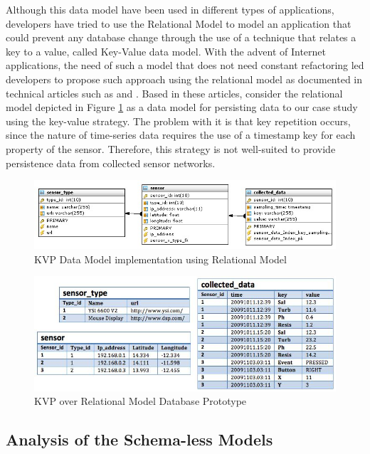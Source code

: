 Although this data model have been used in different types of applications,
developers have tried to use the Relational Model to model an application that
could prevent any database change through the use of a technique that relates a
key to a value, called Key-Value data model. With the advent of Internet
applications, the need of such a model that does not need constant refactoring
led developers to propose such approach using the relational model as
documented in technical articles such as \cite{db-kvp-in-relational01} and
\cite{db-kvp-in-relational02}. Based in these articles, consider the relational
model depicted in Figure \ref{fig:KVP-on-Relational-Model} as a data model for
persisting data to our case study using the key-value strategy. The problem
with it is that key repetition occurs, since the nature of time-series data
requires the use of a timestamp key for each property of the sensor. Therefore,
this strategy is not well-suited to provide persistence data from collected
sensor networks.

\begin{figure}[!h]
  \centering
  \includegraphics[scale=0.6]{../diagrams/KVP-on-Relational-Model}
  \caption{KVP Data Model implementation using Relational Model}
  \label{fig:KVP-on-Relational-Model}
\end{figure}

\begin{figure}[!h]
  \centering
  \includegraphics[scale=0.75]{../diagrams/persistence-example-relational-kvp}
  \caption{KVP over Relational Model Database Prototype}
  \label{fig:persistence-example-relational-kvp}
\end{figure}

\subsection{Analysis of the Schema-less Models}

